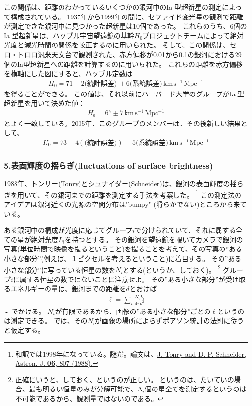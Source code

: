 \documentclass[11pt,a4paper,dvipdfmx]{jsarticle}
\theoremstyle{plain}
\theoremstyle{break}
\begin{document}
この関係は、距離のわかっているいくつかの銀河中のIa 型超新星の測定によって構成されている。
1937年から1999年の間に、セファイド変光星の観測で距離が測定できた銀河中に見つかった超新星は10個であった。
これらのうち、6個のIa 型超新星は、ハッブル宇宙望遠鏡の基幹$H_0$プロジェクトチームによって絶対光度と減光時間の関係を較正するのに用いられた。
そして、この関係は、セロ・トロロ汎米天文台で観測された、赤方偏移が0.01から0.1の銀河における29個のIa型超新星への距離を計算するのに用いられた。
これらの距離を赤方偏移を横軸にした図にすると、ハッブル定数は
\begin{align}
  H_0 = 71 \pm 2 \text{(統計誤差)} \, \pm 6 \text{(系統誤差)} \, \mathrm{km\,s^{-1}\,Mpc^{-1}}
\end{align}
を得ることができる。
この値は、それ以前にハーバード大学のグループがIa 型超新星を用いて決めた値：
\begin{align}
  H_0 = 67 \pm 7 \, \mathrm{km\,s^{-1}\,Mpc^{-1}}
\end{align}
とよく一致している。2005年、このグループのメンバーは、その後新しい結果として、
\begin{align}
  H_0 = 73 \pm 4(\text{(統計誤差)}) \,\pm 5 \text{(系統誤差)} \, \mathrm{km \, s^{-1} \, Mpc^{-1}}
\end{align}
\fi

\subsubsection*{5.表面輝度の揺らぎ(fluctuations of surface brightness)}
1988年、トンリー(Tonry)とシュナイダー(Schneider)は、銀河の表面輝度の揺らぎを用いて、その銀河までの距離を測定する手法を考案した。
\footnote{和訳では1998年になっている。謎だ。論文は、\href{http://articles.adsabs.harvard.edu/cgi-bin/nph-iarticle_query?letter=.&classic=YES&bibcode=1988AJ.....96..807T&page=&type=SCREEN_VIEW&data_type=PDF_LOW&send=GET&filetype=.pdf }{J. Tonry and D. P. Schneider, Astron. J. \textbf{06}, 807 (1988).}}
この測定法のアイデアは銀河近くの光源の空間分布は"bumpy" (滑らかでない)ところから来ている。

ある銀河中の構成が光度に応じてグループ$i$で分けられていて、それに属する全ての星が絶対光度$L_i$を持つとする。
その銀河を望遠鏡を覗いてカメラで銀河の写真(単位時間で映像を撮るということ)を撮ることを考えて、その写真の”ある小さな部分”(例えば、１ピクセルを考えるということ)に着目する。
その”ある小さな部分”に写っている恒星の数を$N_i$とする(というか、しておく)。
\footnote{正確にいうと、しておく、というのが正しい。
というのは、たいていの場合、最も明るい恒星のみが分解可能で、$N_i$個の星全てを測定するというのは不可能であるから、観測量ではないのである。}
グループ$i$に属する恒星の数ではないことに注意せよ。
その”ある小さな部分”が受け取るエネルギーの量は、銀河までの距離を$d$とおけば
\begin{align}
  \ell=\sum_{i} \frac{N_{i} L_{i}}{4 \pi d^{2}}
\end{align}•%
でかける。
$N_i$が有限であるから、画像の”ある小さな部分”ごとの$\ell$というのは測定できる。
では、その$N_i$が画像の場所によらずポアソン統計の法則に従うと仮定する。
\end{document}
